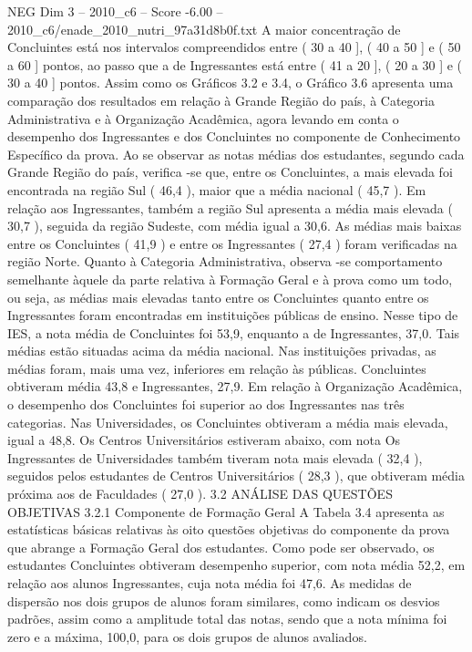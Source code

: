 \begin{textsample}{NEG Dim 3 – 2010\_c6 – Score -6.00 – 2010\_c6/enade\_2010\_nutri\_97a31d8b0f.txt}
A maior concentração de Concluintes está nos intervalos compreendidos entre ( 30 a 40 ], ( 40 a 50 ] e ( 50 a 60 ] pontos, ao passo que a de Ingressantes está entre ( 41 a 20 ], ( 20 a 30 ] e ( 30 a 40 ] pontos.
Assim como os Gráficos 3.2 e 3.4, o Gráfico 3.6 apresenta uma comparação dos resultados em relação à Grande Região do país, à Categoria Administrativa e à Organização Acadêmica, agora levando em conta o desempenho dos Ingressantes e dos Concluintes no componente de Conhecimento Específico da prova.
Ao se observar as notas médias dos estudantes, segundo cada Grande Região do país, verifica -se que, entre os Concluintes, a mais elevada foi encontrada na região Sul ( 46,4 ), maior que a média nacional ( 45,7 ).
Em relação aos Ingressantes, também a região Sul apresenta a média mais elevada ( 30,7 ), seguida da região Sudeste, com média igual a 30,6.
As médias mais baixas entre os Concluintes ( 41,9 ) e entre os Ingressantes ( 27,4 ) foram verificadas na região Norte.
Quanto à Categoria Administrativa, observa -se comportamento semelhante àquele da parte relativa à Formação Geral e à prova como um todo, ou seja, as médias mais elevadas tanto entre os Concluintes quanto entre os Ingressantes foram encontradas em instituições públicas de ensino.
Nesse tipo de IES, a nota média de Concluintes foi 53,9, enquanto a de Ingressantes, 37,0.
Tais médias estão situadas acima da média nacional.
Nas instituições privadas, as médias foram, mais uma vez, inferiores em relação às públicas.
Concluintes obtiveram média 43,8 e Ingressantes, 27,9.
Em relação à Organização Acadêmica, o desempenho dos Concluintes foi superior ao dos Ingressantes nas três categorias.
Nas Universidades, os Concluintes obtiveram a média mais elevada, igual a 48,8.
Os Centros Universitários estiveram abaixo, com nota Os Ingressantes de Universidades também tiveram nota mais elevada ( 32,4 ), seguidos pelos estudantes de Centros Universitários ( 28,3 ), que obtiveram média próxima aos de Faculdades ( 27,0 ). 3.2 ANÁLISE DAS QUESTÕES OBJETIVAS 3.2.1 Componente de Formação Geral A Tabela 3.4 apresenta as estatísticas básicas relativas às oito questões objetivas do componente da prova que abrange a Formação Geral dos estudantes.
Como pode ser observado, os estudantes Concluintes obtiveram desempenho superior, com nota média 52,2, em relação aos alunos Ingressantes, cuja nota média foi 47,6.
As medidas de dispersão nos dois grupos de alunos foram similares, como indicam os desvios padrões, assim como a amplitude total das notas, sendo que a nota mínima foi zero e a máxima, 100,0, para os dois grupos de alunos avaliados.

\end{textsample}

